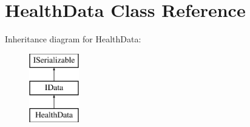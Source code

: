 \hypertarget{class_health_data}{}\section{Health\+Data Class Reference}
\label{class_health_data}
Inheritance diagram for Health\+Data\+:\begin{figure}[H]
\begin{center}
\leavevmode
\includegraphics[height=3.000000cm]{class_health_data}
\end{center}
\end{figure}
